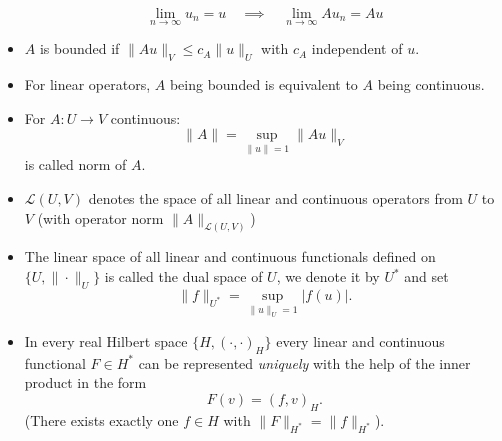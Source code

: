 \documentclass[../skript.tex]{subfiles}
\begin{document}
\begin{itemize}
\[	\lim_{n \to \infty} u_n = u \quad \implies \quad \lim_{n \to \infty} Au_n = Au
\]
\item $A$ is bounded if $\| A u \|_V \leq c_A \| u \|_U$ with $c_A$ independent of $u$.
\item For linear operators, $A$ being bounded is equivalent to $A$ being continuous.
\item For $A : U \to V$ continuous:
\[
	\| A \| = \sup_{\| u \| = 1} \| A u \|_V
\]
is called norm of $A$.
\item $\mathcal{L}(U, V)$ denotes the space of all linear and continuous operators from $U$ to $V$ (with operator norm $\|A\|_{\mathcal{L}(U, V)}$)
\item The linear space of all linear and continuous functionals defined on $\{ U, \| \cdot \|_U \}$ is called the dual space of $U$, we denote it by $U^*$ and set
\[
	\| f \|_{U^*} = \sup_{\| u \|_U = 1} |f(u)|.
\]
\item In every real Hilbert space $\{ H, (\cdot, \cdot)_H \}$ every linear and continuous functional $F \in H^*$ can be represented \emph{uniquely} with the help of the inner product in the form
\[
F(v) = (f, v)_H.
\]
(There exists exactly one $f \in H$ with $\|F\|_{H^*} = \| f \|_{H^*}$).
\end{itemize}
\end{document}
